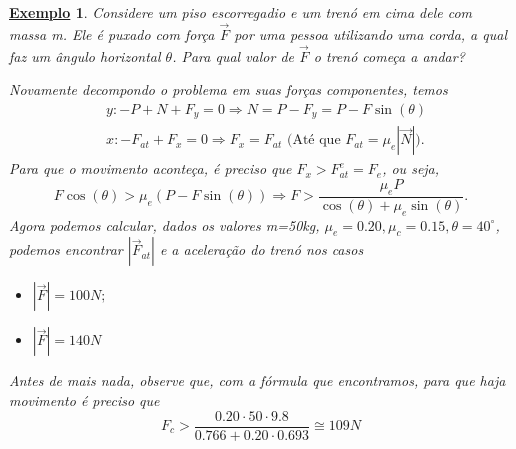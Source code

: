 \documentclass{article}
\newtheorem{example}{\underline{Exemplo}}
\begin{document}
\begin{example}
  Considere um piso escorregadio e um trenó em cima dele com massa m. Ele é puxado com força $\vec{F}$ por uma pessoa utilizando uma corda,
  a qual faz um ângulo horizontal $\theta $. Para qual valor de $\vec{F}$ o trenó começa a andar?
 \begin{center}
 \end{center}

  Novamente decompondo o problema em suas forças componentes, temos 
 \begin{align*}
   &y: -P + N + F_{y} = 0 \Rightarrow N = P - F_{y} = P - F\sin{(\theta )}\\
   &x: -F_{at} + F_{x} = 0 \Rightarrow F_{x} = F_{at} \text{ (Até que } F_{at}=\mu_{e}|\vec{N}|).
 \end{align*}
 Para que o movimento aconteça, é preciso que $F_{x} > F_{at}^{e} = F_{e}$, ou seja, 
   $$
     F\cos{(\theta )} > \mu_{e}(P-F\sin{(\theta )}) \Rightarrow  F > \frac{\mu_{e}P}{\cos{(\theta )}+\mu_{e}\sin{(\theta )}}.
   $$
   Agora podemos calcular, dados os valores m=50kg, $\mu_{e}=0.20, \mu_{c}=0.15, \theta =40^{\circ}$, podemos encontrar
   $|\vec{F}_{at}|$ e a aceleração do trenó nos casos 

  \begin{itemize}
    \item[a)] $|\vec{F}|=100N;$
    \item[b)] $|\vec{F}|=140N$
  \end{itemize}
  
  Antes de mais nada, observe que, com a fórmula que encontramos, para que haja movimento é preciso que 
    $$
      F_{c} > \frac{0.20 \cdot 50 \cdot 9.8}{0.766+0.20 \cdot 0.693} \cong{109N}
    $$


\end{example}
\end{document}
